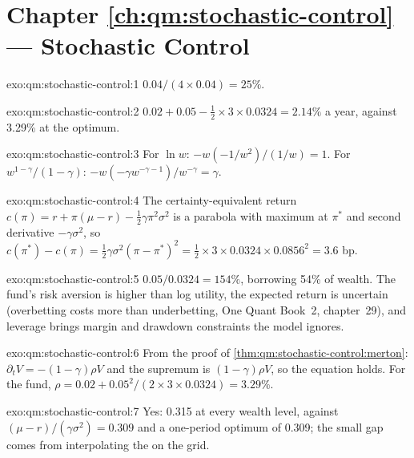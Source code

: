 \section*{Chapter \ref{ch:qm:stochastic-control} --- Stochastic Control}

\begin{solution}{exo:qm:stochastic-control:1}
$0.04/(4 \times 0.04) = 25\%$.
\end{solution}

\begin{solution}{exo:qm:stochastic-control:2}
$0.02 + 0.05 - \tfrac12 \times 3 \times 0.0324 = 2.14\%$ a year, against 3.29\% at the optimum.
\end{solution}

\begin{solution}{exo:qm:stochastic-control:3}
For $\ln w$: $-w(-1/w^2)/(1/w) = 1$. For $w^{1-\gamma}/(1 - \gamma)$: $-w(-\gamma w^{-\gamma-1})/w^{-\gamma} = \gamma$.
\end{solution}

\begin{solution}{exo:qm:stochastic-control:4}
The certainty-equivalent return $c(\pi) = r + \pi(\mu - r) - \tfrac12\gamma\pi^2\sigma^2$ is a parabola with maximum at $\pi^*$ and
second derivative $-\gamma\sigma^2$, so $c(\pi^*) - c(\pi) = \tfrac12\gamma\sigma^2(\pi - \pi^*)^2 = \tfrac12 \times 3 \times 0.0324 \times 0.0856^2 = 3.6$ bp.
\end{solution}

\begin{solution}{exo:qm:stochastic-control:5}
$0.05/0.0324 = 154\%$, borrowing 54\% of wealth. The fund's risk aversion is higher than log utility, the expected
return is uncertain (overbetting costs more than underbetting, One Quant Book~2, chapter~29), and leverage brings
margin and drawdown constraints the model ignores.
\end{solution}

\begin{solution}{exo:qm:stochastic-control:6}
From the proof of \cref{thm:qm:stochastic-control:merton}: $\partial_tV = -(1 - \gamma)\rho V$ and the supremum is $(1 - \gamma)\rho V$,
so the equation holds. For the fund, $\rho = 0.02 + 0.05^2/(2 \times 3 \times 0.0324) = 3.29\%$.
\end{solution}

\begin{solution}{exo:qm:stochastic-control:7}
Yes: 0.315 at every wealth level, against $(\mu - r)/(\gamma\sigma^2) = 0.309$ and a one-period optimum of 0.309; the small gap
comes from interpolating the  on the grid.
\end{solution}


